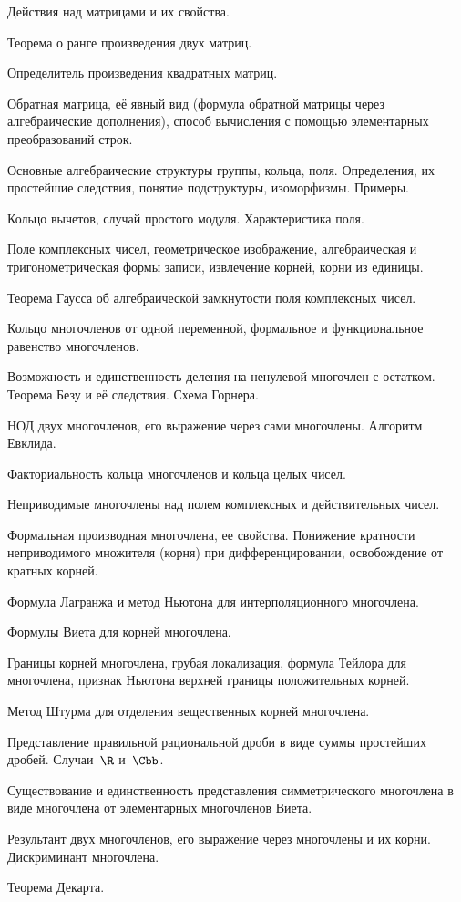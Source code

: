 \documentclass[a4paper]{article}
\begin{document}
\begin{nums}{-2}
\item Действия над матрицами и их свойства.
\item Теорема о ранге произведения двух матриц.
\item Определитель произведения квадратных матриц.
\item Обратная матрица, её явный вид (формула обратной матрицы через алгебраические дополнения),
способ вычисления с помощью элементарных преобразований строк.
\item Основные алгебраические структуры группы, кольца, поля. Определения, их простейшие
следствия, понятие подструктуры, изоморфизмы. Примеры.
\item Кольцо вычетов, случай простого модуля. Характеристика поля.
\item Поле комплексных чисел, геометрическое изображение, алгебраическая и тригонометрическая
формы записи, извлечение корней, корни из единицы.
\item Теорема Гаусса об алгебраической замкнутости поля комплексных чисел.
\item Кольцо многочленов от одной переменной, формальное и функциональное равенство
многочленов.
\item Возможность и единственность деления на ненулевой многочлен с остатком. Теорема Безу и её
следствия. Схема Горнера.
\item НОД двух многочленов, его выражение через сами многочлены. Алгоритм
Евклида.
\item Факториальность кольца многочленов и кольца целых чисел.
\item Неприводимые многочлены над полем комплексных и действительных чисел.
\item Формальная производная многочлена, ее свойства. Понижение кратности неприводимого
множителя (корня) при дифференцировании, освобождение от кратных корней.
\item Формула Лагранжа и метод Ньютона для интерполяционного многочлена.
\item Формулы Виета для корней многочлена.
\item Границы корней многочлена, грубая локализация, формула Тейлора для многочлена, признак
Ньютона верхней границы положительных корней.
\item Метод Штурма для отделения вещественных корней многочлена.
\item Представление правильной рациональной дроби в виде суммы простейших дробей. Случаи~$\R$
и~$\Cbb$.
\item Существование и единственность представления симметрического многочлена в виде многочлена
от элементарных многочленов Виета.
\item Результант двух многочленов, его выражение через многочлены и их корни. Дискриминант
многочлена.
\item Теорема Декарта.
\end{nums}
\pagebreak
\end{document}

